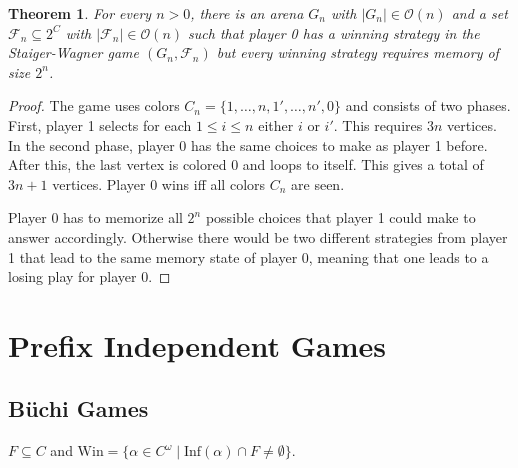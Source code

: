 \documentclass{article}
\newtheorem{theorem}{Theorem}
\begin{document}
\vspace{0.5cm}
\begin{theorem}
	For every $n > 0$, there is an arena $G_n$ with $|G_n| \in \mathcal{O}(n)$ and a set $\mathcal{F}_n \subseteq 2^C$ with $|\mathcal{F}_n| \in \mathcal{O}(n)$ such that player 0 has a winning strategy in the Staiger-Wagner game $(G_n, \mathcal{F}_n)$ but every winning strategy requires memory of size $2^n$.
\end{theorem}
\begin{proof}
	The game uses colors $C_n = \{1, \dots, n, 1', \dots, n', 0\}$ and consists of two phases. First, player 1 selects for each $1 \leq i \leq n$ either $i$ or $i'$. This requires $3n$ vertices. In the second phase, player 0 has the same choices to make as player 1 before. After this, the last vertex is colored $0$ and loops to itself. This gives a total of $3n+1$ vertices. Player 0 wins iff all colors $C_n$ are seen.
	
	Player 0 has to memorize all $2^n$ possible choices that player 1 could make to answer accordingly. Otherwise there would be two different strategies from player 1 that lead to the same memory state of player 0, meaning that one leads to a losing play for player 0.
\end{proof}

\section{Prefix Independent Games}
\subsection{Büchi Games}
$F \subseteq C$ and $\text{Win} = \{ \alpha \in C^\omega \mid \text{Inf}(\alpha) \cap F \neq \emptyset \}$.
\end{document}
